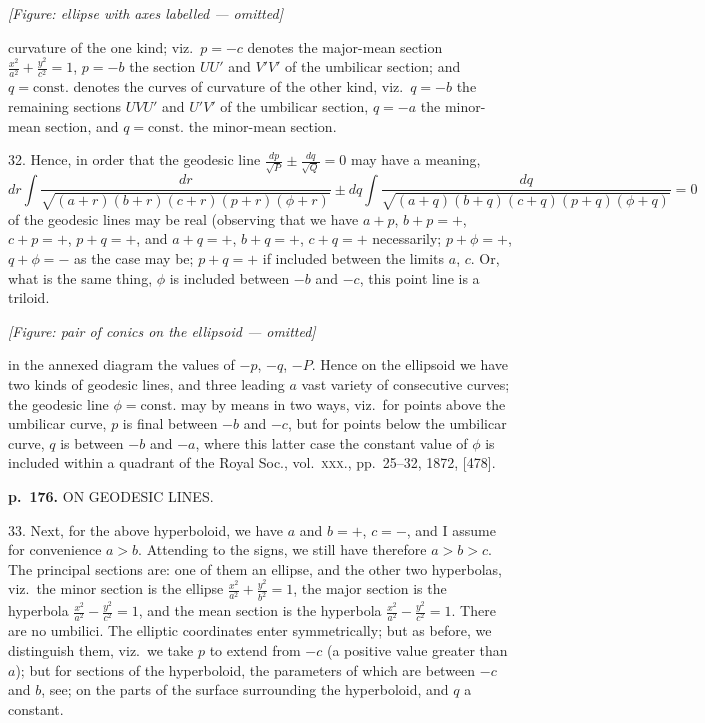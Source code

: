 \documentclass[11pt,a4paper]{article}
\begin{document}
\begin{center}
\textit{[Figure: ellipse with axes labelled --- omitted]}
\end{center}

curvature of the one kind; viz.\ $p = -c$ denotes the major-mean section $\frac{x^2}{a^2} + \frac{y^2}{c^2} = 1$, $p = -b$ the section $UU'$ and $V'V'$ of the umbilicar section; and $q = \mathrm{const.}$ denotes the curves of curvature of the other kind, viz.\ $q = -b$ the remaining sections $UVU'$ and $U'V'$ of the umbilicar section, $q = -a$ the minor-mean section, and $q = \mathrm{const.}$ the minor-mean section.

32. Hence, in order that the geodesic line $\frac{dp}{\sqrt{P}} \pm \frac{dq}{\sqrt{Q}} = 0$ may have a meaning,
\[
dr \int \frac{dr}{\sqrt{(a + r)(b + r)(c + r)(p + r)(\phi + r)}} \pm dq \int \frac{dq}{\sqrt{(a + q)(b + q)(c + q)(p + q)(\phi + q)}} = 0
\]
of the geodesic lines may be real (observing that we have $a + p$, $b + p = +$, $c + p = +$, $p + q = +$, and $a + q = +$, $b + q = +$, $c + q = +$ necessarily; $p + \phi = +$, $q + \phi = -$ as the case may be; $p + q = +$ if included between the limits $a$, $c$. Or, what is the same thing, $\phi$ is included between $-b$ and $-c$, this point line is a triloid.

\textit{[Figure: pair of conics on the ellipsoid --- omitted]}

in the annexed diagram the values of $-p$, $-q$, $-P$.  Hence on the ellipsoid we have two kinds of geodesic lines, and three leading $a$ vast variety of consecutive curves; the geodesic line $\phi = \mathrm{const.}$ may by means in two ways, viz.\ for points above the umbilicar curve, $p$ is final between $-b$ and $-c$, but for points below the umbilicar curve, $q$ is between $-b$ and $-a$, where this latter case the constant value of $\phi$ is included within a quadrant of the Royal Soc., vol.\ \textsc{xxx.}, pp.\ 25--32, 1872, [478].

\clearpage

\noindent
\textbf{p.~176.}  ON GEODESIC LINES.

33. Next, for the above hyperboloid, we have $a$ and $b = +$, $c = -$, and I assume for convenience $a > b$.  Attending to the signs, we still have therefore $a > b > c$. The principal sections are: one of them an ellipse, and the other two hyperbolas, viz.\ the minor section is the ellipse $\frac{x^2}{a^2} + \frac{y^2}{b^2} = 1$, the major section is the hyperbola $\frac{x^2}{a^2} - \frac{y^2}{c^2} = 1$, and the mean section is the hyperbola $\frac{x^2}{a^2} - \frac{y^2}{c^2} = 1$.  There are no umbilici. The elliptic coordinates enter symmetrically; but as before, we distinguish them, viz.\ we take $p$ to extend from $-c$ (a positive value greater than $a$); but for sections of the hyperboloid, the parameters of which are between $-c$ and $b$, see; on the parts of the surface surrounding the hyperboloid, and $q$ a constant.
\end{document}
